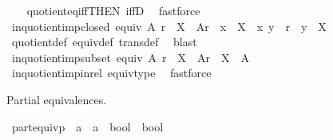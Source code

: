 \begin{isabellebody}
%
\isadelimproof
\ \ %
\endisadelimproof
%
\isatagproof
{}\isamarkupfalse%
\ quotient{\isacharunderscore}{\kern0pt}eq{\isacharunderscore}{\kern0pt}iff{\isacharbrackleft}{\kern0pt}THEN\ iffD{}{\isacharbrackright}{\kern0pt}\ \isamarkupfalse%
\ fastforce%
\endisatagproof
{\isafoldproof}%
%
\isadelimproof
\isanewline
%
\endisadelimproof
\isanewline
{}\isamarkupfalse%
\ in{\isacharunderscore}{\kern0pt}quotient{\isacharunderscore}{\kern0pt}imp{\isacharunderscore}{\kern0pt}closed{\isacharcolon}{\kern0pt}\ {\isachardoublequoteopen}equiv\ A\ r\ {\isasymLongrightarrow}\ X\ {\isasymin}\ A{\isacharslash}{\kern0pt}{\isacharslash}{\kern0pt}r\ {\isasymLongrightarrow}\ x\ {\isasymin}\ X\ {\isasymLongrightarrow}\ {\isacharparenleft}{\kern0pt}x{\isacharcomma}{\kern0pt}\ y{\isacharparenright}{\kern0pt}\ {\isasymin}\ r\ {\isasymLongrightarrow}\ y\ {\isasymin}\ X{\isachardoublequoteclose}\isanewline
%
\isadelimproof
\ \ %
\endisadelimproof
%
\isatagproof
{}\isamarkupfalse%
\ quotient{\isacharunderscore}{\kern0pt}def\ equiv{\isacharunderscore}{\kern0pt}def\ trans{\isacharunderscore}{\kern0pt}def\ \isamarkupfalse%
\ blast%
\endisatagproof
{\isafoldproof}%
%
\isadelimproof
\isanewline
%
\endisadelimproof
\isanewline
{}\isamarkupfalse%
\ in{\isacharunderscore}{\kern0pt}quotient{\isacharunderscore}{\kern0pt}imp{\isacharunderscore}{\kern0pt}subset{\isacharcolon}{\kern0pt}\ {\isachardoublequoteopen}equiv\ A\ r\ {\isasymLongrightarrow}\ X\ {\isasymin}\ A{\isacharslash}{\kern0pt}{\isacharslash}{\kern0pt}r\ {\isasymLongrightarrow}\ X\ {\isasymsubseteq}\ A{\isachardoublequoteclose}\isanewline
%
\isadelimproof
\ \ %
\endisadelimproof
%
\isatagproof
{}\isamarkupfalse%
\ in{\isacharunderscore}{\kern0pt}quotient{\isacharunderscore}{\kern0pt}imp{\isacharunderscore}{\kern0pt}in{\isacharunderscore}{\kern0pt}rel\ equiv{\isacharunderscore}{\kern0pt}type\ \isamarkupfalse%
\ fastforce%
\endisatagproof
{\isafoldproof}%
%
\isadelimproof
%
\endisadelimproof
%
\isadelimdocument
%
\endisadelimdocument
%
\isatagdocument
%
\isamarkuptrue%
%
\endisatagdocument
{\isafolddocument}%
%
\isadelimdocument
%
\endisadelimdocument
%
\begin{isamarkuptext}%
Partial equivalences.%
\end{isamarkuptext}\isamarkuptrue%
\isamarkupfalse%
\ part{\isacharunderscore}{\kern0pt}equivp\ {\isacharcolon}{\kern0pt}{\isacharcolon}{\kern0pt}\ {\isachardoublequoteopen}{\isacharparenleft}{\kern0pt}{\isacharprime}{\kern0pt}a\ {\isasymRightarrow}\ {\isacharprime}{\kern0pt}a\ {\isasymRightarrow}\ bool{\isacharparenright}{\kern0pt}\ {\isasymRightarrow}\ bool{\isachardoublequoteclose}\isanewline

\end{isabellebody}
